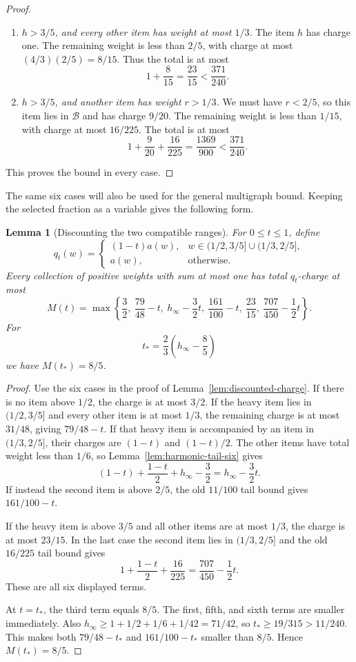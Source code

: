 \documentclass[11pt]{article}
\newtheorem{lemma}[theorem]{Lemma}
\theoremstyle{definition}\newtheorem{algorithm}{Algorithm}[section]
\numberwithin{equation}{section}
\theoremstyle{remark}\newtheorem*{remark}{Remark}
\begin{document}
\begin{proof}
\begin{enumerate}
\item
\textit{$h>3/5$, and every other item has weight at most $1/3$.}
The item $h$ has charge one. The remaining weight is less than $2/5$,
with charge at most $(4/3)(2/5)=8/15$. Thus the total is at most
\[
 1+\frac8{15}=\frac{23}{15}<\frac{371}{240}.
\]

\item
\textit{$h>3/5$, and another item has weight $r>1/3$.}
We must have $r<2/5$, so this item lies in $\mathcal B$ and has charge
$9/20$. The remaining weight is less than $1/15$, with charge at most
$16/225$. The total is at most
\[
 1+\frac9{20}+\frac{16}{225}
 =\frac{1369}{900}<\frac{371}{240}.
\]
\end{enumerate}
This proves the bound in every case.
\end{proof}

The same six cases will also be used for the general multigraph bound.
Keeping the selected fraction as a variable gives the following form.

\begin{lemma}[Discounting the two compatible ranges]
\label{lem:discounted-charge-parameter}
For $0\le t\le1$, define
\[
 q_t(w)=
 \begin{cases}
  (1-t)a(w),&w\in(1/2,3/5]\cup(1/3,2/5],\\
  a(w),&\text{otherwise}.
 \end{cases}
\]
Every collection of positive weights with sum at most one has total
$q_t$-charge at most
\[
 M(t)=\max\left\{
 \frac32,\ \frac{79}{48}-t,\ h_\infty-\frac32t,\
 \frac{161}{100}-t,\ \frac{23}{15},\
 \frac{707}{450}-\frac12t
 \right\}.
\]
For
\[
 t_*=\frac23\left(h_\infty-\frac85\right)
\]
we have $M(t_*)=8/5$.
\end{lemma}
\begin{proof}
Use the six cases in the proof of Lemma~\ref{lem:discounted-charge}.
If there is no item above $1/2$, the charge is at most $3/2$.
If the heavy item lies in $(1/2,3/5]$ and every other item is at most
$1/3$, the remaining charge is at most $31/48$, giving
$79/48-t$.  If that heavy item is accompanied by an item in
$(1/3,2/5]$, their charges are $(1-t)$ and $(1-t)/2$.  The other
items have total weight less than $1/6$, so
Lemma~\ref{lem:harmonic-tail-six} gives
\[
 (1-t)+\frac{1-t}{2}+h_\infty-\frac32
 =h_\infty-\frac32t.
\]
If instead the second item is above $2/5$, the old $11/100$ tail bound
gives $161/100-t$.

If the heavy item is above $3/5$ and all other items are at most $1/3$,
the charge is at most $23/15$.  In the last case the second item lies
in $(1/3,2/5]$ and the old $16/225$ tail bound gives
\[
 1+\frac{1-t}{2}+\frac{16}{225}
 =\frac{707}{450}-\frac12t.
\]
These are all six displayed terms.

At $t=t_*$, the third term equals $8/5$.  The first, fifth, and sixth
terms are smaller immediately.  Also
$h_\infty\ge1+1/2+1/6+1/42=71/42$, so $t_*\ge19/315>11/240$.
This makes both $79/48-t_*$ and $161/100-t_*$ smaller than $8/5$.
Hence $M(t_*)=8/5$.
\end{proof}
\end{document}
